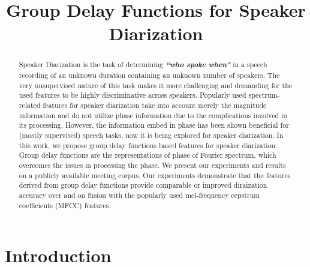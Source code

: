 \documentclass[conference]{IEEEtran}
\begin{document}
\title{Group Delay Functions for Speaker Diarization}

\author{
}

\maketitle


\begin{abstract}

Speaker Diarization is the task of determining {\bf\textit{``who spoke when"}}
in a speech recording of an unknown duration containing an unknown number of
speakers. The very unsupervised nature of this task makes it more challenging
and demanding for the used features to be highly discriminative across speakers.
Popularly used spectrum-related features for speaker diarization take into
account merely the magnitude information and do not utilize phase information
due to the complications involved in its processing. However, the information
embed in phase has been shown beneficial for (mostly supervised) speech tasks,
now it is being explored for speaker diarization. In this work, we propose
group delay functions based features for speaker diarization. Group delay
functions are the representations of phase of Fourier spectrum, which overcomes
the issues in processing the phase. We present our experiments and results on a
publicly available meeting corpus. Our experiments demonstrate that the features
derived from group delay functions provide comparable or improved diraization
accuracy over and on fusion with the popularly used mel-frequency cepstrum
coefficients (MFCC) features. \\

\end{abstract}
\IEEEpeerreviewmaketitle



\section{Introduction}
\label{intro}
\end{document}
